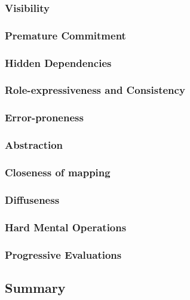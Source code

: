 \subsubsection[*]{Visibility}

\subsubsection[*]{Premature Commitment}

\subsubsection[*]{Hidden Dependencies}

\subsubsection[*]{Role-expressiveness and Consistency}

\subsubsection[*]{Error-proneness}

\subsubsection[*]{Abstraction}

\subsubsection[*]{Closeness of mapping}

\subsubsection[*]{Diffuseness}

\subsubsection[*]{Hard Mental Operations}

\subsubsection[*]{Progressive Evaluations}

\subsection{Summary}
